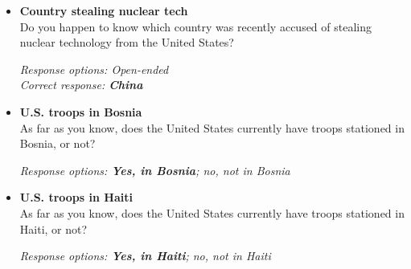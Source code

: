 \documentclass[12pt, letterpaper]{article}
\begin{document}
   \begin{itemize}
\item \textbf{Country stealing nuclear tech} \\
Do you happen to know which country was recently accused of stealing nuclear technology from the United States?

\textit{Response options: Open-ended}\\
\textit{Correct response: \textbf{China}}
\end{itemize}

   \begin{itemize}
\item \textbf{U.S. troops in Bosnia} \\
As far as you know, does the United States currently have troops stationed in Bosnia, or not?

\textit{Response options: \textbf{Yes, in Bosnia}; no, not in Bosnia}
\end{itemize}

   \begin{itemize}
\item \textbf{U.S. troops in Haiti} \\
As far as you know, does the United States currently have troops stationed in Haiti, or not? 

\textit{Response options: \textbf{Yes, in Haiti}; no, not in Haiti}
\end{itemize}
\end{document}
